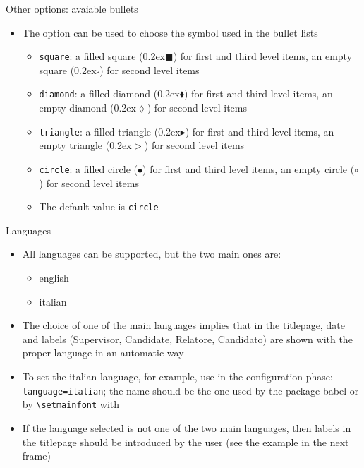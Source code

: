\begin{frame}[t,fragile]{Other options: avaiable bullets}
\begin{itemize}
\item The  option can be used to choose the symbol used in the bullet lists
  \begin{itemize}
  \item \verb!square!: a filled square
        ({\tiny\raise0.2ex\hbox{$\blacksquare$}}) for
        first and third level items, an empty square
        ({\tiny\raise0.2ex\hbox{$\square$}}) for
        second level items
  \item \verb!diamond!: a filled diamond
        ({\tiny\raise0.2ex\hbox{$\blacklozenge$}}) for
        first and third level items, an empty diamond
        ({\tiny\raise0.2ex\hbox{$\lozenge$}}) for
        second level items
  \item \verb!triangle!: a filled triangle
        ({\tiny\raise0.2ex\hbox{$\blacktriangleright$}}) for
        first and third level items, an empty triangle
        ({\tiny\raise0.2ex\hbox{$\vartriangleright$}}) for
        second level items
  \item \verb!circle!: a filled circle ({$\bullet$})
        for first and third level items, an empty circle
        ({$\circ$}) for second level items
  \item The default value is \verb!circle!
  \end{itemize}
\end{itemize}
\end{frame}

\begin{frame}[t,fragile]{Languages}
\begin{itemize}
\item All languages can be supported, but the two main ones are:
\begin{itemize}
\item english
\item italian 
\end{itemize}
\item The choice of one of the main languages implies that in the titlepage, date and labels (Supervisor, Candidate, Relatore, Candidato) are shown with the proper language in an automatic way
\item To set the italian language, for example, use in the configuration phase:
\verb!language=italian!; the name should be the one used by the package babel or by \verb!\setmainfont! with \XeLaTeX
\item If the language selected is not one of the two main languages, then labels in the titlepage should be introduced by the user (see the example in the next frame)
\end{itemize}
\end{frame}

